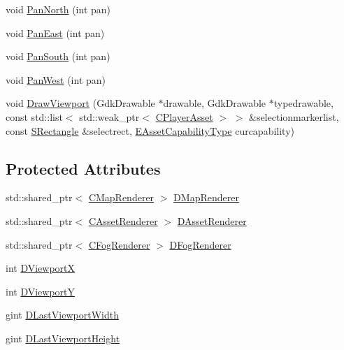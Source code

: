\begin{DoxyCompactItemize}
\item 
void \hyperlink{classCViewportRenderer_a3dae20056eb4f9fc1c7d8238737ab290}{Pan\+North} (int pan)
\item 
void \hyperlink{classCViewportRenderer_a047d0b83f7744a9d8b184471dae0cd3c}{Pan\+East} (int pan)
\item 
void \hyperlink{classCViewportRenderer_ad4aa68d96923dbea1bfd9ae3f23a3132}{Pan\+South} (int pan)
\item 
void \hyperlink{classCViewportRenderer_aa09c1b984311f77ea1cdcdc74a7a0316}{Pan\+West} (int pan)
\item 
void \hyperlink{classCViewportRenderer_ad5cf67fd6d4d69f861dbc0b773cdcab2}{Draw\+Viewport} (Gdk\+Drawable $\ast$drawable, Gdk\+Drawable $\ast$typedrawable, const std\+::list$<$ std\+::weak\+\_\+ptr$<$ \hyperlink{classCPlayerAsset}{C\+Player\+Asset} $>$ $>$ \&selectionmarkerlist, const \hyperlink{structSRectangle}{S\+Rectangle} \&selectrect, \hyperlink{GameDataTypes_8h_a35b98ce26aca678b03c6f9f76e4778ce}{E\+Asset\+Capability\+Type} curcapability)
\end{DoxyCompactItemize}
\subsection*{Protected Attributes}
\begin{DoxyCompactItemize}
\item 
std\+::shared\+\_\+ptr$<$ \hyperlink{classCMapRenderer}{C\+Map\+Renderer} $>$ \hyperlink{classCViewportRenderer_ac6bc7771bd6dcd35107d25bebb0c0a4c}{D\+Map\+Renderer}
\item 
std\+::shared\+\_\+ptr$<$ \hyperlink{classCAssetRenderer}{C\+Asset\+Renderer} $>$ \hyperlink{classCViewportRenderer_a3daa075c87bbdde4d1ada41f0b98f4a8}{D\+Asset\+Renderer}
\item 
std\+::shared\+\_\+ptr$<$ \hyperlink{classCFogRenderer}{C\+Fog\+Renderer} $>$ \hyperlink{classCViewportRenderer_a2fa9d183d00bdba4a2fea6d946992608}{D\+Fog\+Renderer}
\item 
int \hyperlink{classCViewportRenderer_aea9e05347f71a8e6b83439aab653be18}{D\+ViewportX}
\item 
int \hyperlink{classCViewportRenderer_ae13dd437a3da3d2bab16bc7ba61cb78f}{D\+ViewportY}
\item 
gint \hyperlink{classCViewportRenderer_aaa21acd1b43badc3c1a3b0bf9b0f86f9}{D\+Last\+Viewport\+Width}
\item 
gint \hyperlink{classCViewportRenderer_aaca5c330615fc2aacc57dede8e7c18b0}{D\+Last\+Viewport\+Height}
\end{DoxyCompactItemize}


